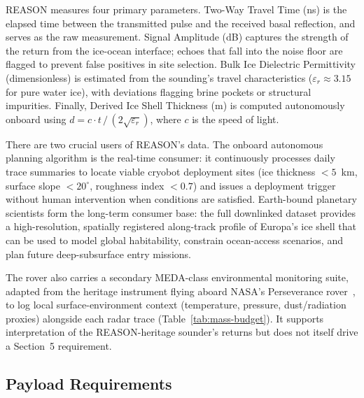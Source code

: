 \documentclass[11pt]{article}
\begin{document}
REASON measures four primary parameters. Two-Way Travel Time (ns) is the elapsed time between
the transmitted pulse and the received basal reflection, and serves as the raw measurement.
Signal Amplitude (dB) captures the strength of the return from the ice-ocean interface; echoes
that fall into the noise floor are flagged to prevent false positives in site selection. Bulk Ice
Dielectric Permittivity (dimensionless) is estimated from the sounding's travel characteristics
($\varepsilon_r \approx 3.15$ for pure water ice), with deviations flagging brine pockets or
structural impurities. Finally, Derived Ice Shell Thickness (m) is computed autonomously onboard
using $d = c \cdot t\,/\,(2\sqrt{\varepsilon_r})$, where $c$ is the speed of light.

There are two crucial users of REASON's data. The onboard autonomous planning algorithm is the
real-time consumer: it continuously processes daily trace summaries to locate viable cryobot
deployment sites (ice thickness $<5$~km, surface slope $<20^\circ$, roughness index $<0.7$) and
issues a deployment trigger without human intervention when conditions are satisfied.
Earth-bound planetary scientists form the long-term consumer base: the full downlinked dataset
provides a high-resolution, spatially registered along-track profile of Europa's ice shell that
can be used to model global habitability, constrain ocean-access scenarios, and plan future
deep-subsurface entry missions.

The rover also carries a secondary MEDA-class environmental monitoring suite, adapted from the
heritage instrument flying aboard NASA's Perseverance rover~\cite{roverComponents}, to log local
surface-environment context (temperature, pressure, dust/radiation proxies) alongside each radar
trace (Table~\ref{tab:mass-budget}). It supports interpretation of the REASON-heritage sounder's
returns but does not itself drive a Section~5 requirement.

\subsection{Payload Requirements}
\end{document}
